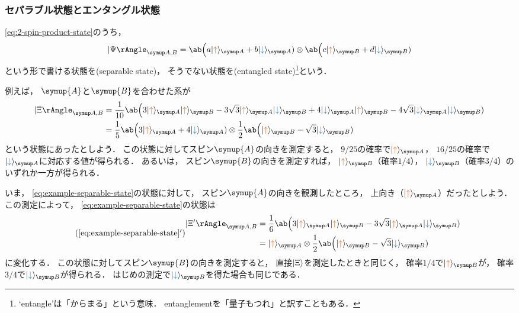 \documentclass[
]{sotsu}
\newcommand{\bitone}{\mathcolor{fire}{\uparrow}}
\newcommand{\bittwo}{\mathcolor{water}{\downarrow}}
\begin{document}
\subsubsection{セパラブル状態とエンタングル状態}

\cref{eq:2-spin-product-state}のうち，
\begin{equation}
    \Ket{\Psi}<A,B> = 
        \ab\Big( a \ket{\bitone}<A> + b \ket{\bittwo}<A> )
        \otimes 
        \ab\Big( c \ket{\bitone}<B> + d \ket{\bittwo}<B> )
\end{equation}
という形で書ける状態を(separable state)，
そうでない状態を(entangled state)\footnote{
    `entangle'は「からまる」という意味．
    entanglementを「量子もつれ」と訳すこともある．
}という．

\quad 
例えば，
$\symup{A}$と$\symup{B}$を合わせた系が
\begin{equation}
    \label{eq:example-separable-state}
    \begin{split}
        \Ket{\Xi}<A,B>
        &= \frac{1}{10} \ab\Big(
              3 \ket{\bitone}<A> \ket{\bitone}<B>
            - 3\sqrt{3} \ket{\bitone}<A> \ket{\bittwo}<B>
            + 4 \ket{\bittwo}<A> \ket{\bitone}<B>
            - 4\sqrt{3} \ket{\bittwo}<A> \ket{\bittwo}<B>
        )
        \\
        &= \frac{1}{5} \ab\Big( 3 \ket{\bitone}<A> + 4 \ket{\bittwo}<A> )
            \otimes 
           \frac{1}{2} \ab\Big( \ket{\bitone}<B> - \sqrt{3} \ket{\bittwo}<B> )
    \end{split}
\end{equation}
という状態にあったとしよう．
この状態に対してスピン$\symup{A}$の向きを測定すると，
$9/25$の確率で$\ket{\bitone}<A>$，
$16/25$の確率で$\ket{\bittwo}<A>$に対応する値が得られる．
あるいは，
スピン$\symup{B}$の向きを測定すれば，
$\ket{\bitone}<B>$（確率$1/4$），
$\ket{\bittwo}<B>$（確率$3/4$）のいずれか一方が得られる．

いま，
\cref{eq:example-separable-state}の状態に対して，
スピン$\symup{A}$の向きを観測したところ，
上向き（$\ket{\bitone}<A>$）だったとしよう．
この測定によって，
\cref{eq:example-separable-state}の状態は
\begin{equation*}
    \tag{\ref*{eq:example-separable-state}$'$}
    \begin{split}
        \Ket{\Xi'}<A,B>
        &= \frac{1}{6} \ab\Big(
            3 \ket{\bitone}<A> \ket{\bitone}<B>
            - 3 \sqrt{3} \ket{\bitone}<A> \ket{\bittwo}<B>
        )
        \\
        &= \ket{\bitone}<A>
            \otimes 
           \frac{1}{2} \ab\Big( \ket{\bitone}<B> - \sqrt{3} \ket{\bittwo}<B> )
    \end{split}
\end{equation*}
に変化する．
この状態に対してスピン$\symup{B}$の向きを測定すると，
直接$\ket{\Xi}$を測定したときと同じく，
確率$1/4$で$\ket{\bitone}<B>$が，
確率$3/4$で$\ket{\bittwo}<B>$が得られる．
はじめの測定で$\ket{\bittwo}<B>$を得た場合も同じである．
\end{document}
